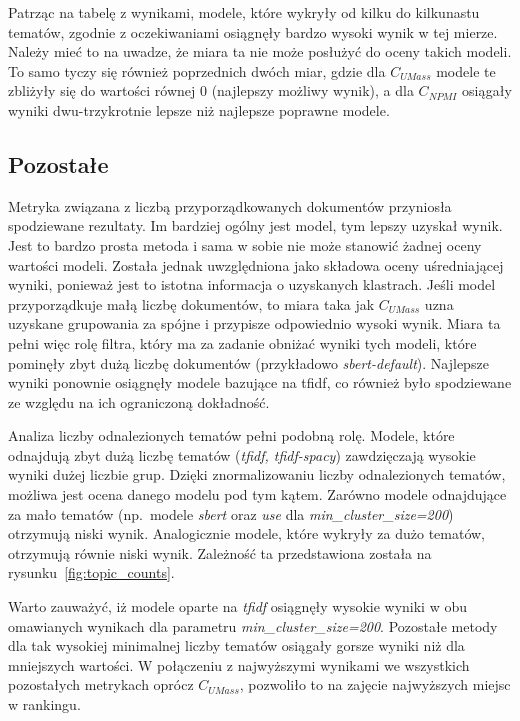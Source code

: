 		Patrząc na tabelę z wynikami, modele, które wykryły od kilku do kilkunastu tematów, zgodnie z oczekiwaniami osiągnęły bardzo wysoki wynik w tej mierze.
		Należy mieć to na uwadze, że miara ta nie może posłużyć do oceny takich modeli.
		To samo tyczy się również poprzednich dwóch miar, gdzie dla \(C_{UMass}\) modele te zbliżyły się do wartości równej 0 (najlepszy możliwy wynik),
			a dla \(C_{NPMI}\) osiągały wyniki dwu-trzykrotnie lepsze niż najlepsze poprawne modele.

	\subsection{Pozostałe}
		Metryka związana z liczbą przyporządkowanych dokumentów przyniosła spodziewane rezultaty.
		Im bardziej ogólny jest model, tym lepszy uzyskał wynik.
		Jest to bardzo prosta metoda i sama w sobie nie może stanowić żadnej oceny wartości modeli.
		Została jednak uwzględniona jako składowa oceny uśredniającej wyniki, ponieważ jest to istotna informacja o uzyskanych klastrach.
		Jeśli model przyporządkuje małą liczbę dokumentów, to miara taka jak \(C_{UMass}\) uzna uzyskane grupowania za spójne i przypisze odpowiednio wysoki wynik.
		Miara ta pełni więc rolę filtra, który ma za zadanie obniżać wyniki tych modeli, które pominęły zbyt dużą liczbę dokumentów (przykładowo \emph{sbert-default}).
		Najlepsze wyniki ponownie osiągnęły modele bazujące na tfidf, co również było spodziewane ze względu na ich ograniczoną dokładność.

		Analiza liczby odnalezionych tematów pełni podobną rolę.
		Modele, które odnajdują zbyt dużą liczbę tematów (\emph{tfidf, tfidf-spacy}) zawdzięczają wysokie wyniki dużej liczbie grup.
		Dzięki znormalizowaniu liczby odnalezionych tematów, możliwa jest ocena danego modelu pod tym kątem.
		Zarówno modele odnajdujące za mało tematów (np.~modele \emph{sbert} oraz \emph{use} dla \emph{min\_cluster\_size=200}) otrzymują niski wynik.
		Analogicznie modele, które wykryły za dużo tematów, otrzymują równie niski wynik.
		Zależność ta przedstawiona została na rysunku~\ref{fig:topic_counts}.
		
		Warto zauważyć, iż modele oparte na \emph{tfidf} osiągnęły wysokie wyniki w obu omawianych wynikach dla parametru \emph{min\_cluster\_size=200}.
		Pozostałe metody dla tak wysokiej minimalnej liczby tematów osiągały gorsze wyniki niż dla mniejszych wartości.
		W połączeniu z najwyższymi wynikami we wszystkich pozostałych metrykach oprócz \(C_{UMass}\), pozwoliło to na zajęcie najwyższych miejsc w rankingu.